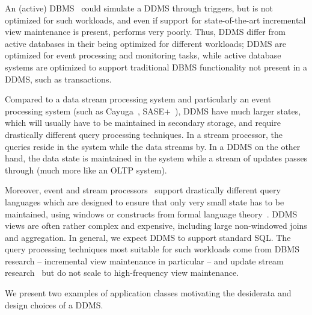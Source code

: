 An (active) DBMS~\cite{ceri-vldb:00} could simulate a DDMS through triggers, but
is not optimized for such workloads, and even if support for state-of-the-art
incremental view maintenance is present, performs very poorly. Thus, DDMS differ
from active databases in their being optimized for different workloads; DDMS are
optimized for event processing and monitoring tasks, while active database
systems are optimized to support traditional DBMS functionality not present in a
DDMS, such as transactions.




Compared to a data stream processing system and particularly an event processing
system (such as Cayuga~\cite{demers-sigmod:07}, SASE+~\cite{agrawal-sigmod:08}),
DDMS have much larger states, which will usually have to be maintained in
secondary storage, and require drastically different query processing
techniques. In a stream processor, the queries reside in the system while the
data streams by. In a DDMS on the other hand, the data state is maintained in
the system while a stream of updates passes through (much more like an OLTP
system).

%
Moreover, event and stream processors~\cite{abadi-vldbj:03, motwani-cidr:03,
chandrasekaran-cidr:03} support drastically different query languages which are
designed to ensure that only very small state has to be maintained, using
windows or constructs from formal language theory~\cite{white-pods:07}. DDMS
views are often rather complex and expensive, including large non-windowed joins
and aggregation. In general, we expect DDMS to support standard SQL.
The query processing techniques most suitable for such workloads come from DBMS
research -- incremental view maintenance in particular -- and update stream
research~\cite{ghanem-tods:10} but do not scale to high-frequency view
maintenance.



\medskip

We present two examples of application classes motivating the desiderata and
design choices of a DDMS.

